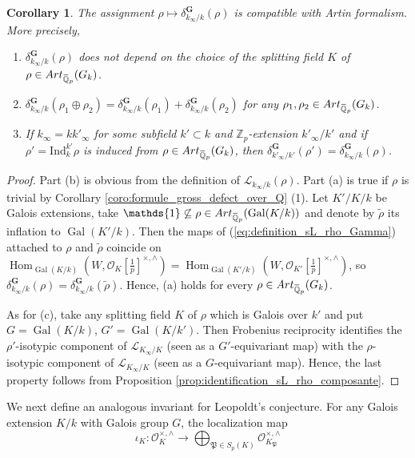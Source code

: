 \documentclass[12pt]{amsart}
\newcommand{\Q}{\mathbb{Q}}
\newcommand\bQ{\mathbb{Q}}
\newcommand\Zp{{\mathbb{Z}_p}}
\newcommand\cO{\mathcal{O}}
\newcommand\gP{\mathfrak{P}}
\newcommand\sL{\mathscr{L}}
\newcommand{\ob}[1]{\mkern 1.5mu\overline{\mkern-1.5mu#1\mkern-1.5mu}\mkern 1.5mu}
\newcommand{\Ind}{\mathrm{Ind}}
\newcommand{\Art}{\textrm{Art}}
\DeclareMathOperator{\Gal}{Gal}
\DeclareMathOperator{\Hom}{Hom}
\theoremstyle{defstyle}
\theoremstyle{thmstyle}
\newtheorem{corollaire}[subsubsection]{Corollary}
\begin{document}
	\begin{corollaire}\label{coro:artin_formalism}
		The assignment $\rho \mapsto \delta^\textbf{G}_{k_\infty/k}(\rho)$ is compatible with Artin formalism. More precisely, 
		\begin{enumerate}
			\item[(a)] $\delta^\textbf{G}_{k_\infty/k}(\rho)$ does not depend on the choice of the splitting field $K$ of $\rho\in \Art_{\ob{\bQ}_p}(G_k)$.
			\item[(b)] $\delta^\textbf{G}_{k_\infty/k}(\rho_1\oplus \rho_2)=\delta^\textbf{G}_{k_\infty/k}(\rho_1)+\delta^\textbf{G}_{k_\infty/k}(\rho_2)$ for any $\rho_1,\rho_2\in \Art_{\ob{\bQ}_p}(G_k)$.
			\item[(c)] If $k_\infty=kk'_\infty$ for some subfield $k'\subset k$ and $\Zp$-extension $k'_\infty/k'$ and if $\rho'=\Ind_k^{k'}\rho$ is induced from $\rho\in \Art_{\ob{\bQ}_p}(G_k)$, then $\delta^\textbf{G}_{k'_\infty/k'}(\rho')=\delta^\textbf{G}_{k_\infty/k}(\rho)$.
		\end{enumerate}
	\end{corollaire}
	\begin{proof}
		Part (b) is obvious from the definition of $\sL_{k_\infty/k}(\rho)$. Part (a) is true if $\rho$ is trivial by Corollary \ref{coro:formule_gross_defect_over_Q} (1). Let $K'/K/k$ be Galois extensions, take $\mathds{1} \not\subseteq {\rho} \in \Art_{\ob{\Q}_p}(\Gal(K/k))$ and denote by $\tilde{\rho}$ its inflation to $\Gal(K'/k)$. Then the maps of (\ref{eq:definition_sL_rho_Gamma}) attached to $\rho$ and $\tilde{\rho}$ coincide on $\Hom_{\Gal(K/k)}(W,\cO_K[\tfrac{1}{p}]^{\times,\wedge})=\Hom_{\Gal(K'/k)}(W,\cO_{K'}[\tfrac{1}{p}]^{\times,\wedge})$, so $\delta^\textbf{G}_{k_\infty/k}(\rho)=\delta^\textbf{G}_{k_\infty/k}(\tilde{\rho})$. Hence, (a) holds for every $\rho\in \Art_{\ob{\Q}_p}(G_k)$. 
		
		As for (c), take any splitting field $K$ of $\rho$ which is Galois over $k'$ and put $G=\Gal(K/k)$, $G'=\Gal(K/k')$. Then Frobenius reciprocity identifies the $\rho'$-isotypic component of $\sL_{K_\infty/K}$ (seen as a $G'$-equivariant map) with the $\rho$-isotypic component of $\sL_{K_\infty/K}$ (seen as a $G$-equivariant map). Hence, the last property follows from Proposition \ref{prop:identification_sL_rho_composante}.
	\end{proof}
	We next define an analogous invariant for Leopoldt's conjecture. For any Galois extension $K/k$ with Galois group $G$, the localization map 
	\begin{equation*}
		\iota_K \colon \cO_K^{\times,\wedge} \longrightarrow \bigoplus_{\gP\in S_p(K)} \cO_{K_\gP}^{\times,\wedge}
	\end{equation*}
\end{document}
